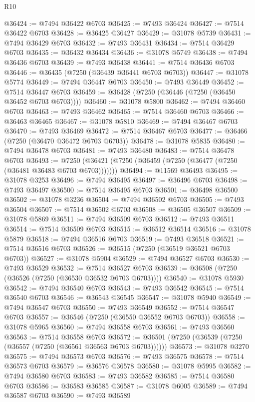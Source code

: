 \begin{lexlean}{R10}
\begin{coremodule}
@36424 := @7494 @36422 @6703
@36425 := @7493 @36424
@36427 := @7514 @36422 @6703
@36428 := @36425 @36427
@36429 := @31078 @5739
@36431 := @7494 @36429 @6703
@36432 := @7493 @36431
@36434 := @7514 @36429 @6703
@36435 := @36432 @36434
@36436 := @31078 @5749
@36438 := @7494 @36436 @6703
@36439 := @7493 @36438
@36441 := @7514 @36436 @6703
@36446 := @36435 (@7250 (@36439 @36441 @6703 @6703))
@36447 := @31078 @5774
@36449 := @7494 @36447 @6703
@36450 := @7493 @36449
@36452 := @7514 @36447 @6703
@36459 := @36428 (@7250 (@36446 (@7250 (@36450 @36452 @6703 @6703))))
@36460 := @31078 @5800
@36462 := @7494 @36460 @6703
@36463 := @7493 @36462
@36465 := @7514 @36460 @6703
@36466 := @36463 @36465
@36467 := @31078 @5810
@36469 := @7494 @36467 @6703
@36470 := @7493 @36469
@36472 := @7514 @36467 @6703
@36477 := @36466 (@7250 (@36470 @36472 @6703 @6703))
@36478 := @31078 @5835
@36480 := @7494 @36478 @6703
@36481 := @7493 @36480
@36483 := @7514 @36478 @6703
@36493 := @7250 (@36421 (@7250 (@36459 (@7250 (@36477 (@7250 (@36481 @36483 @6703 @6703)))))))
@36494 := @11569 @36493
@36495 := @31078 @3253
@36496 := @7494 @36495
@36497 := @36496 @6703
@36498 := @7493 @36497
@36500 := @7514 @36495 @6703
@36501 := @36498 @36500
@36502 := @31078 @3236
@36504 := @7494 @36502 @6703
@36505 := @7493 @36504
@36507 := @7514 @36502 @6703
@36508 := @36505 @36507
@36509 := @31078 @5869
@36511 := @7494 @36509 @6703
@36512 := @7493 @36511
@36514 := @7514 @36509 @6703
@36515 := @36512 @36514
@36516 := @31078 @5879
@36518 := @7494 @36516 @6703
@36519 := @7493 @36518
@36521 := @7514 @36516 @6703
@36526 := @36515 (@7250 (@36519 @36521 @6703 @6703))
@36527 := @31078 @5904
@36529 := @7494 @36527 @6703
@36530 := @7493 @36529
@36532 := @7514 @36527 @6703
@36539 := @36508 (@7250 (@36526 (@7250 (@36530 @36532 @6703 @6703))))
@36540 := @31078 @5930
@36542 := @7494 @36540 @6703
@36543 := @7493 @36542
@36545 := @7514 @36540 @6703
@36546 := @36543 @36545
@36547 := @31078 @5940
@36549 := @7494 @36547 @6703
@36550 := @7493 @36549
@36552 := @7514 @36547 @6703
@36557 := @36546 (@7250 (@36550 @36552 @6703 @6703))
@36558 := @31078 @5965
@36560 := @7494 @36558 @6703
@36561 := @7493 @36560
@36563 := @7514 @36558 @6703
@36572 := @36501 (@7250 (@36539 (@7250 (@36557 (@7250 (@36561 @36563 @6703 @6703))))))
@36573 := @31078 @3270
@36575 := @7494 @36573 @6703
@36576 := @7493 @36575
@36578 := @7514 @36573 @6703
@36579 := @36576 @36578
@36580 := @31078 @5995
@36582 := @7494 @36580 @6703
@36583 := @7493 @36582
@36585 := @7514 @36580 @6703
@36586 := @36583 @36585
@36587 := @31078 @6005
@36589 := @7494 @36587 @6703
@36590 := @7493 @36589

\end{coremodule}
\end{lexlean}
